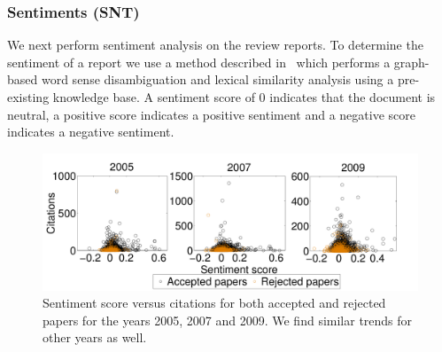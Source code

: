 \subsubsection{Sentiments (SNT)}
We next perform sentiment analysis on the review reports. To determine the sentiment of a report we use a method described in~\cite{montejo2012random} which performs a graph-based word sense disambiguation and lexical similarity analysis using a pre-existing knowledge base. A sentiment score of 0 indicates that the document is neutral, a positive score  indicates a positive sentiment and a negative score indicates a negative sentiment. 


\begin{figure}[htpb]
\centering
\includegraphics[scale=0.23]{./texfiles/Chapter_4/jcdl/figures/year_sent_cit-eps-converted-to.pdf}
\caption{Sentiment score versus citations for both accepted and rejected papers for the years 2005, 2007 and 2009. We find similar trends for other years as well.}
\label{fig12}
\end{figure}

